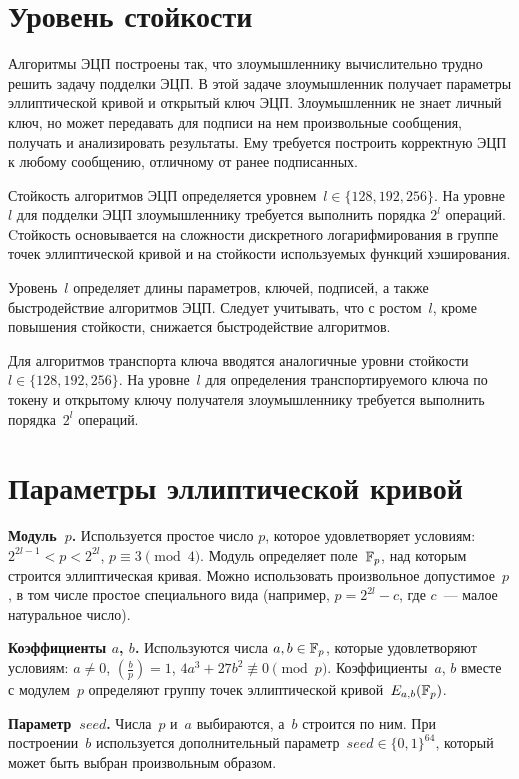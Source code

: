 \section{Уровень стойкости}\label{COMMON.Strength}

Алгоритмы ЭЦП построены так, что злоумышленнику 
вычислительно трудно решить задачу подделки ЭЦП.
%
В этой задаче злоумышленник получает параметры эллиптической кривой 
и открытый ключ ЭЦП. Злоумышленник не знает личный ключ, 
но может передавать для подписи на нем произвольные сообщения, 
получать и анализировать результаты.
%
Ему требуется построить корректную ЭЦП к любому сообщению,
отличному от ранее подписанных.

Стойкость алгоритмов ЭЦП определяется уровнем~$l\in\{128,192,256\}$.
%
На уровне~$l$ для подделки ЭЦП злоумышленнику требуется выполнить 
порядка $2^l$ операций. 
%
Cтойкость основывается на сложности дискретного логарифмирования 
в группе точек эллиптической кривой и на стойкости используемых 
функций хэширования.

Уровень~$l$ определяет длины параметров, 
ключей, подписей, а также быстродействие алгоритмов ЭЦП. 
%
Следует учитывать, что с ростом~$l$, кроме повышения стойкости,
снижается быстродействие алгоритмов.

Для алгоритмов транспорта ключа вводятся аналогичные уровни 
стойкости~$l\in\{128,192,256\}$.
На уровне~$l$ для определения транспортируемого ключа 
по токену и открытому ключу получателя 
злоумышленнику требуется выполнить порядка~$2^l$ операций. 

\section{Параметры эллиптической кривой}\label{COMMON.Params}

{\bf Модуль~$p$.} 
Используется простое число $p$, которое удовлетворяет условиям:
$2^{2l-1}<p<2^{2l}$, $p\equiv 3\pmod{4}$.
%
Модуль определяет поле~$\mathbb{F}_p$, 
над которым строится эллиптическая кривая.
%
Можно использовать произвольное допустимое~$p$, 
в том числе простое специального вида 
(например, $p=2^{2l}-c$, где $c$~--- малое натуральное число).

{\bf Коэффициенты $a$, $b$.} 
Используются числа $a,b\in\mathbb{F}_p$, которые удовлетворяют условиям:
$a\neq 0$,
$\left(\frac{b}{p}\right)=1$,
$4a^3+27b^2\not\equiv 0\pmod{p}$.
%
Коэффициенты~$a$, $b$ вместе с модулем~$p$ 
определяют группу точек эллиптической кривой~$E_{a,b}(\mathbb{F}_p)$.

{\bf Параметр~$seed$.} 
Числа~$p$ и~$a$ выбираются, а~$b$ строится по ним.
При построении~$b$ используется дополнительный
параметр~$seed\in\{0,1\}^{64}$,
который может быть выбран произвольным образом.


